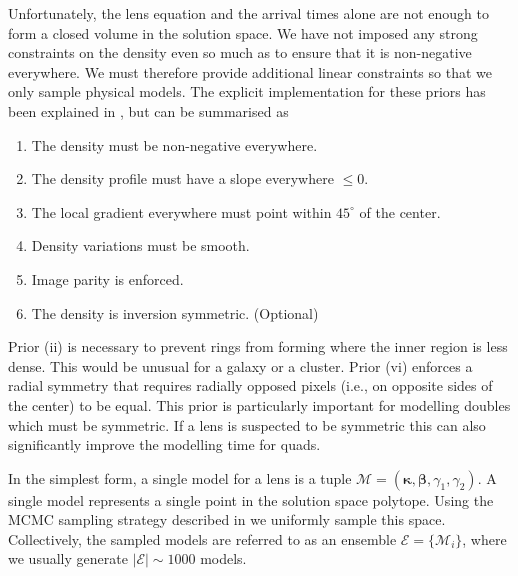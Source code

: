 \documentclass[galley,usenatbib]{mn2e}
\renewcommand{\vec}[1]{\ensuremath{\boldsymbol{#1}}}
\newcommand{\M}{\ensuremath{\mathscr{M}}}
\newcommand{\E}{\ensuremath{\mathscr{E}}}
\begin{document}
Unfortunately, the lens equation and the arrival times alone are not enough to
form a closed volume in the solution space. We have not imposed any strong
constraints on the density even so much as to ensure that it is non-negative
everywhere. We must therefore provide additional linear constraints so that we
only sample physical models. The explicit implementation for these priors has
been explained in \cite{2008ApJ...679...17C}, but can be summarised as
%
\begin{enumerate}
\item The density must be non-negative everywhere.
\item The density profile must have a slope everywhere $\le 0$.
\item The local gradient everywhere must point within $45^{\circ}$ of the center.
\item Density variations must be smooth.
\item Image parity is enforced.
\item The density is inversion symmetric. (Optional)
\end{enumerate}

Prior (ii) is necessary to prevent rings from forming where the inner region is
less dense. This would be unusual for a galaxy or a cluster. Prior (vi)
enforces a radial symmetry that requires radially opposed pixels (i.e., on
opposite sides of the center) to be equal. This prior is particularly important
for modelling doubles which must be symmetric. If a lens is suspected to be
symmetric this can also significantly improve the modelling time for quads.

In the simplest form, a single model for a lens is a tuple $\M = (\vec\kappa,
\vec\beta, \gamma_1, \gamma_2)$. A single model represents a single point in
the solution space polytope. Using the MCMC sampling strategy described in
\cite{2012MNRAS.425.3077L} we uniformly sample this space. Collectively, the
sampled models are referred to as an ensemble $\E = \{\M_i\}$, where we usually
generate $|\E| \sim 1000$ models.
\end{document}
